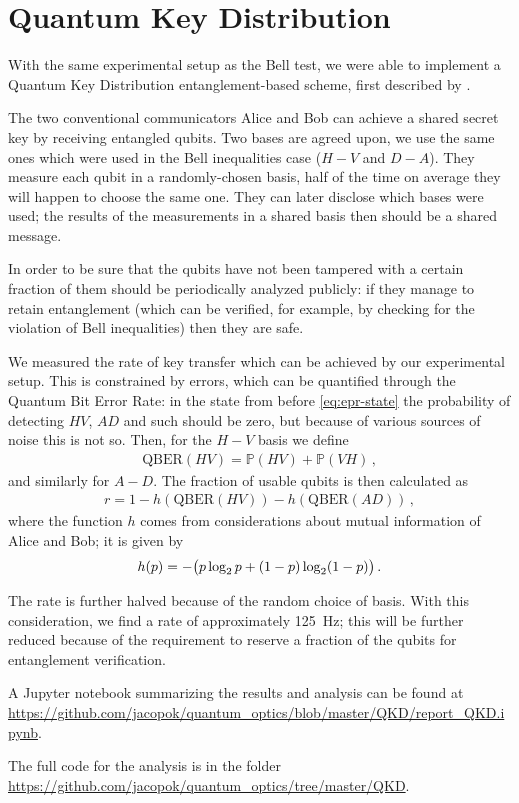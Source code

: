 \documentclass[main.tex]{subfiles}
\begin{document}
\section{Quantum Key Distribution}

With the same experimental setup as the Bell test, we were able to implement a Quantum Key Distribution entanglement-based scheme, first described by \textcite{bennettQuantumCryptographyBell1992}. 

The two conventional communicators Alice and Bob can achieve a shared secret key by receiving entangled qubits. 
Two bases are agreed upon, we use the same ones which were used in the Bell inequalities case (\(H-V\) and \(D-A\)).
They measure each qubit in a randomly-chosen basis, half of the time on average they will happen to choose the same one.
They can later disclose which bases were used; the results of the measurements in a shared basis then should be a shared message. 

In order to be sure that the qubits have not been tampered with a certain fraction of them should be periodically analyzed publicly: if they manage to retain entanglement (which can be verified, for example, by checking for the violation of Bell inequalities) then they are safe. 

We measured the rate of key transfer which can be achieved by our experimental setup. 
This is constrained by errors, which can be quantified through the Quantum Bit Error Rate: in the state from before \eqref{eq:epr-state} the probability of detecting \(HV\), \(AD\) and such should be zero, but because of various sources of noise this is not so.
Then, for the \(H-V\) basis we define 
%
\begin{align}
\text{QBER}(HV) = \mathbb{P}(HV)+ \mathbb{P}(VH)
\,,
\end{align}
%
and similarly for \(A-D\). 
The fraction of usable qubits is then calculated as 
%
\begin{align}
r = 
1
- h (\text{QBER}(HV))
- h (\text{QBER}(AD))
\,,
\end{align}
%
where the function \(h\) comes from considerations about mutual information of Alice and Bob; it is given by 
%
\begin{align}
h (p) = - \qty(p \log_2 p + (1-p) \log_2 (1-p) )
\,.
\end{align}

The rate is further halved because of the random choice of basis. With this consideration, we find a rate of approximately \SI{125}{Hz}; this will be further reduced because of the requirement to reserve a fraction of the qubits for entanglement verification.

A Jupyter notebook summarizing the results and analysis can be found at \url{https://github.com/jacopok/quantum_optics/blob/master/QKD/report_QKD.ipynb}.

The full code for the analysis is in the folder \url{https://github.com/jacopok/quantum_optics/tree/master/QKD}.
\end{document}
